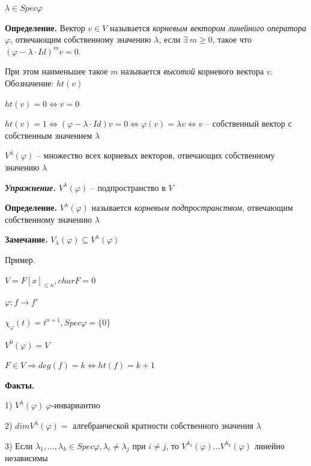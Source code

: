 $\lambda \in Spec \varphi$

\vspace{\baselineskip}
\textbf{Определение.} Вектор $v \in V$ называется \textit{корневым вектором линейного оператора} $\varphi$, отвечающим собственному значению $\lambda$, если $\exists \ m \geqslant 0$, такое что $(\varphi - \lambda \cdot Id)^m v = 0$.

При этом наименьшее такое $m$ называется \textit{высотой} корневого вектора $v$. Обозначение: $ht(v)$

\vspace{\baselineskip}
$ht(v) = 0 \Leftrightarrow v = 0$

$ht(v) = 1 \Leftrightarrow (\varphi - \lambda \cdot Id) v = 0 \Leftrightarrow \varphi(v) = \lambda v \Leftrightarrow v$ -- собственный вектор с собственным значением $\lambda$

\vspace{\baselineskip}
$V^{\lambda} (\varphi)$ -- множество всех корневых векторов, отвечающих собственному значению $\lambda$

\vspace{\baselineskip}
\textbf{\textit{Упражнение.}} $V^{\lambda} (\varphi)$ -- подпространство в $V$

\vspace{\baselineskip}
\textbf{Определение.} $V^{\lambda} (\varphi)$ называется \textit{корневым подпространством}, отвечающим собственному значению $\lambda$

\vspace{\baselineskip}
\textbf{Замечание.} $V_{\lambda} (\varphi) \subseteq V^{\lambda} (\varphi)$

\vspace{\baselineskip}
Пример.

$V = F[x]_{\leqslant n}, char F = 0$

$\varphi: f \rightarrow f'$

$\chi_{\varphi}(t) = t^{n+1}, Spec \varphi = \{0\}$

$V^0 (\varphi) = V$

$F \in V \Rightarrow deg(f) = k \Leftrightarrow ht(f) = k + 1$

\vspace{\baselineskip}
\textbf{Факты.}

1) $V^{\lambda} (\varphi) \ \varphi$-инвариантно

2) $dim V^{\lambda} (\varphi) = $ алгебраической кратности собственного значения $\lambda$

3) Если $\lambda_1, \dots, \lambda_k \in Spec \varphi, \lambda_i \neq \lambda_j$ при $i \neq j$, то $V^{\lambda_1} (\varphi) \dots V^{\lambda_k} (\varphi)$ линейно независимы

